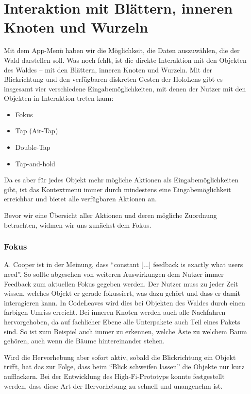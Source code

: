 \section{Interaktion mit Blättern, inneren Knoten und Wurzeln}
\label{sec:object-interaction}

Mit dem App-Menü haben wir die Möglichkeit, die Daten auszuwählen, die der Wald darstellen soll. Was noch fehlt, ist die direkte Interaktion mit den Objekten des Waldes -- mit den Blättern, inneren Knoten und Wurzeln. Mit der Blickrichtung und den verfügbaren diskreten Gesten der HoloLens gibt es insgesamt vier verschiedene Eingabemöglichkeiten, mit denen der Nutzer mit den Objekten in Interaktion treten kann:

\begin{itemize}
  \item Fokus
  \item Tap (Air-Tap)
  \item Double-Tap
  \item Tap-and-hold
\end{itemize}

Da es aber für jedes Objekt mehr mögliche Aktionen als Eingabemöglichkeiten gibt, ist das Kontextmenü immer durch mindestens eine Eingabemöglichkeit erreichbar und bietet alle verfügbaren Aktionen an.

Bevor wir eine Übersicht aller Aktionen und deren mögliche Zuordnung betrachten, widmen wir uns zunächst dem Fokus.

\subsubsection*{Fokus}

A. Cooper ist in \cite{cooper2014face} der Meinung, dass ``constant [...] feedback is exactly what users need''. So sollte abgesehen von weiteren Auswirkungen dem Nutzer immer Feedback zum aktuellen Fokus gegeben werden. Der Nutzer muss zu jeder Zeit wissen, welches Objekt er gerade fokussiert, was dazu gehört und dass er damit interagieren kann. In CodeLeaves wird dies bei Objekten des Waldes durch einen farbigen Umriss erreicht. Bei inneren Knoten werden auch alle Nachfahren hervorgehoben, da auf fachlicher Ebene alle Unterpakete auch Teil eines Pakets sind. So ist zum Beispiel auch immer zu erkennen, welche Äste zu welchem Baum gehören, auch wenn die Bäume hintereinander stehen.

Wird die Hervorhebung aber sofort aktiv, sobald die Blickrichtung ein Objekt trifft, hat das zur Folge, dass beim "`Blick schweifen lassen"' die Objekte nur kurz aufflackern. Bei der Entwicklung des High-Fi-Prototyps konnte festgestellt werden, dass diese Art der Hervorhebung zu schnell und unangenehm ist.

